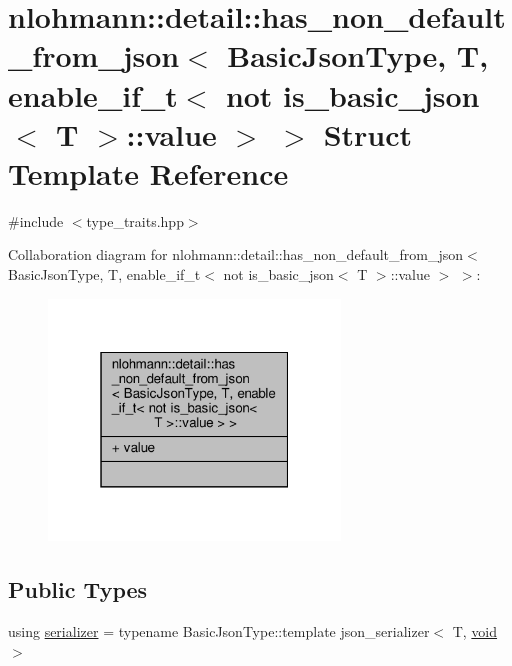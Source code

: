 \hypertarget{structnlohmann_1_1detail_1_1has__non__default__from__json_3_01_basic_json_type_00_01_t_00_01enab81bd4c814ac1146ff15f3f4636933207}{}\section{nlohmann\+:\+:detail\+:\+:has\+\_\+non\+\_\+default\+\_\+from\+\_\+json$<$ Basic\+Json\+Type, T, enable\+\_\+if\+\_\+t$<$ not is\+\_\+basic\+\_\+json$<$ T $>$\+:\+:value $>$ $>$ Struct Template Reference}
\label{structnlohmann_1_1detail_1_1has__non__default__from__json_3_01_basic_json_type_00_01_t_00_01enab81bd4c814ac1146ff15f3f4636933207}


{\ttfamily \#include $<$type\+\_\+traits.\+hpp$>$}



Collaboration diagram for nlohmann\+:\+:detail\+:\+:has\+\_\+non\+\_\+default\+\_\+from\+\_\+json$<$ Basic\+Json\+Type, T, enable\+\_\+if\+\_\+t$<$ not is\+\_\+basic\+\_\+json$<$ T $>$\+:\+:value $>$ $>$\+:
\nopagebreak
\begin{figure}[H]
\begin{center}
\leavevmode
\includegraphics[width=220pt]{structnlohmann_1_1detail_1_1has__non__default__from__json_3_01_basic_json_type_00_01_t_00_01enab3642c0bea3747783bbeaacbe6cd88a0e}
\end{center}
\end{figure}
\subsection*{Public Types}
\begin{DoxyCompactItemize}
\item 
using \hyperlink{structnlohmann_1_1detail_1_1has__non__default__from__json_3_01_basic_json_type_00_01_t_00_01enab81bd4c814ac1146ff15f3f4636933207_a610272ed924122e0c46d158ecdfe6faf}{serializer} = typename Basic\+Json\+Type\+::template json\+\_\+serializer$<$ T, \hyperlink{namespacenlohmann_1_1detail_a59fca69799f6b9e366710cb9043aa77d}{void} $>$
\end{DoxyCompactItemize}
